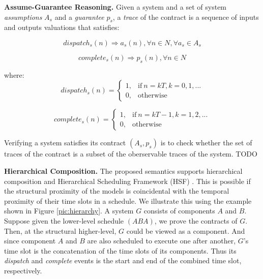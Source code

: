 {\bf Assume-Guarantee Reasoning.}
Given a system and a set of system \emph{assumptions} $A_s$ and a \emph{guarantee} $p_s$, a \emph{trace} of the contract is a sequence of inputs and outputs valuations that satisfies:

\begin{equation} 
\label{eqn:sys_assumption}
dispatch_s(n) \Rightarrow a_s(n), \forall n\in N, \forall a_s \in A_s
\end{equation}

\begin{equation} 
\label{eqn:sys_assumption}
complete_s(n) \Rightarrow p_s(n), \forall n\in N
\end{equation}

where:
\begin{equation}
\label{eqn:sys_dispatch}
    dispatch_s(n) =
    \begin{cases}
      1, & \text{if}\ n = kT, k=0,1,... \\
      0, & \text{otherwise}
    \end{cases}
\end{equation}

\begin{equation}
\label{eqn:sys_complete}
    complete_s(n) =
    \begin{cases}
      1, & \text{if}\ n = kT-1, k=1,2,... \\
      0, & \text{otherwise}
    \end{cases}
\end{equation}

Verifying a system satisfies its contract $(A_s, p_s)$ is to check whether the set of traces of the contract is a subset of the oberservable traces of the system. TODO

{\bf Hierarchical Composition.}
The proposed semantics supports hierarchical composition and Hierarchical Scheduling Framework (HSF) \cite{HSF}. This is possible if the structural proximity of the models is coincidental with the temporal proximity of their time slots in a schedule. We illustrate this using the example shown in Figure \ref{pic:hierarchy}. A system $G$ consists of components $A$ and $B$. Suppose given the lower-level schedule $(ABA)$, we prove the contracts of $G$. Then, at the structural higher-level, $G$ could be viewed as a component. And since component $A$ and $B$ are also scheduled to execute one after another, $G$'s time slot is the concatenation of the time slots of its components. Thus its \emph{dispatch} and \emph{complete} events is the start and end of the combined time slot, respectively.

